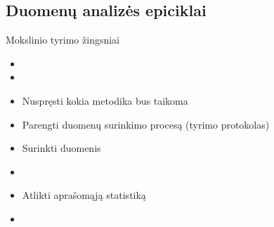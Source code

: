 \documentclass[11pt,xcolor=table]{beamer}
\begin{document}
\subsection{Duomenų analizės epiciklai}

\begin{frame}{Mokslinio tyrimo žingsniai}
\begin{itemize}
\item {\color{red}{Labai daug skaityti}}
\item {\color{blue}{Išvystyti klausimą / hipotezę}}
\item Nuspręsti kokia metodika bus taikoma
\item Parengti duomenų surinkimo procesą (tyrimo protokolas)
\item Surinkti duomenis
\item {\color{blue}{Atlikti tiriamąją statistiką}}
\item Atlikti aprašomąją statistiką
\item {\color{blue}{Modeliuoti, atlikti prognozes
\item Interpretuoti rezultatus
\item Aprašyti tyrimo eigą bei rezultatus}}
\end{itemize}
\end{frame}
\end{document}
